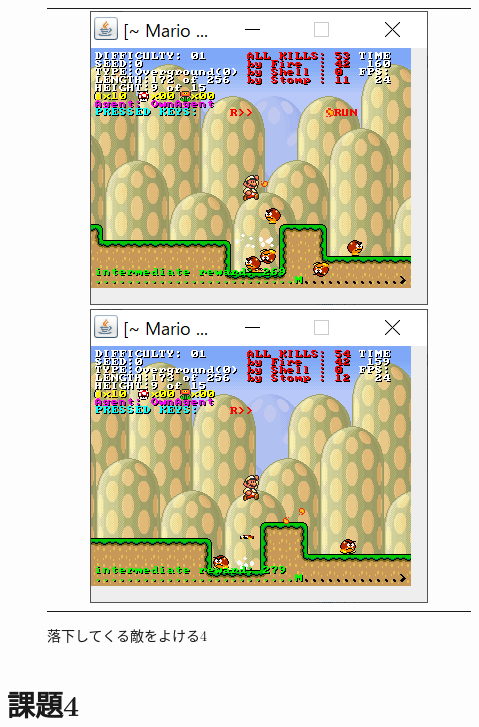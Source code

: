 \documentclass{jsarticle}
\begin{document}
\begin{figure}[H]
\begin{tabular}{c}
	\begin{minipage}{0.50\hsize}
		\includegraphics{avoid3.png}
		\caption{落下してくる敵をよける3}
	\end{minipage}
	\begin{minipage}{0.50\hsize}
		\includegraphics{avoid4.png}
		\caption{落下してくる敵をよける4}
	\end{minipage}
	\end{tabular}
\end{figure}

\section{課題4}
\end{document}
